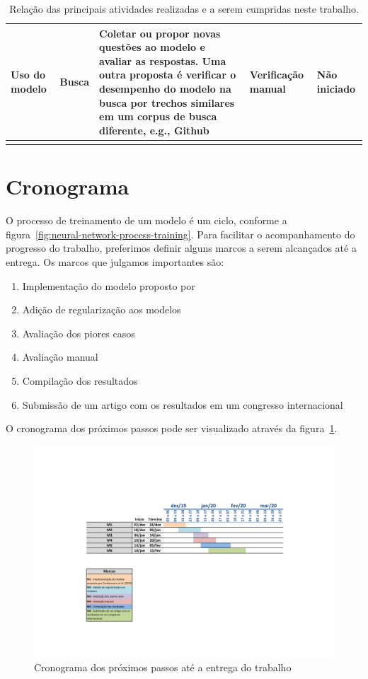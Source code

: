 {\begin{longtable}{ p{8em} p{8em} p{10em} p{8em} p{6em} }
Uso do modelo & Busca & Coletar ou propor novas questões ao modelo e avaliar as respostas. Uma outra proposta é verificar o desempenho do modelo na busca por trechos similares em um corpus de busca diferente, e.g., Github & Verificação manual & Não iniciado \\
\hline

 
\caption{Relação das principais atividades realizadas e a serem cumpridas neste trabalho.}
\label{table:etapas-processo-treinamento}
\end{longtable}}


\section{Cronograma}

O processo de treinamento de um modelo é um ciclo, conforme a figura~\ref{fig:neural-network-process-training}. Para facilitar o acompanhamento do progresso do trabalho, preferimos definir alguns marcos a serem alcançados até a entrega. Os marcos que julgamos importantes são:

\begin{enumerate}
\item Implementação do modelo proposto por \cite{cambronero-deep-learning-code-search:2019}

\item Adição de regularização aos modelos

\item Avaliação dos piores casos

\item Avaliação manual

\item Compilação dos resultados

\item Submissão de um artigo com os resultados em um congresso internacional

\end{enumerate}

O cronograma dos próximos passos pode ser visualizado através da figura~\ref{fig:cronograma-proximos-passos-gantt-chart}.

\begin{figure}[h]
    \centering
    \includegraphics[width=1\textwidth]{figuras/cap-cronograma/cronograma_trabalho.pdf}
    \caption{Cronograma dos próximos passos até a entrega do trabalho}
    \label{fig:cronograma-proximos-passos-gantt-chart}
\end{figure}



